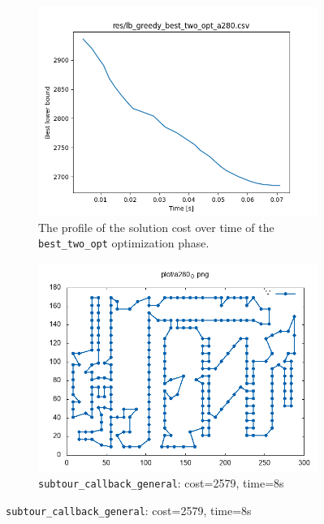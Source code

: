 \begin{figure}[!h]
\begin{subfigure}{.5\columnwidth}
		\includegraphics[width=\columnwidth]{../res/lb_greedy_best_two_opt_a280.png}
		\caption{The profile of the solution cost over time of the \texttt{best\_two\_opt} optimization phase.}
		\label{fig:lb_greedy_best_two_opt_a280}
	\end{subfigure}
	\begin{subfigure}{.5\columnwidth}
		\centering
		\includegraphics[width=\columnwidth]{../res/a280_0.png}
		\caption{\texttt{subtour\_callback\_general}: cost=2579, time=8s}
		\label{fig:a280_0}
	\end{subfigure}
\end{figure}


